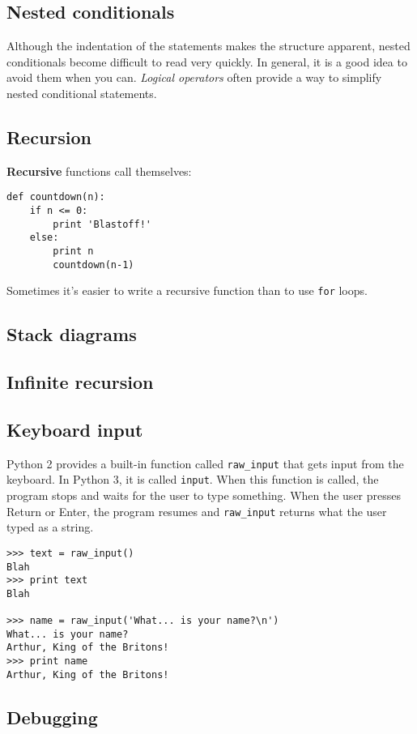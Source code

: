 \documentclass{article}
\begin{document}
\subsection{Nested conditionals}
Although the indentation of the statements makes the structure apparent, nested
conditionals become difficult to read very quickly. In general, it is a good
idea to avoid them when you can. \textit{Logical operators} often provide a way
to simplify nested conditional statements.

\subsection{Recursion}
\textbf{Recursive} functions call themselves:
\begin{lstlisting}
def countdown(n):
    if n <= 0:
        print 'Blastoff!'
    else:
        print n
        countdown(n-1)
\end{lstlisting}
Sometimes it's easier to write a recursive function than to use \verb|for| loops.

\subsection{Stack diagrams}
\subsection{Infinite recursion}
\subsection{Keyboard input}
Python 2 provides a built-in function called \verb|raw_input| that gets input from the
keyboard. In Python 3, it is called \verb|input|. When this function is called, the
program stops and waits for the user to type something. When the user presses
Return or Enter, the program resumes and \verb|raw_input| returns what the user typed
as a string.
\begin{lstlisting}
>>> text = raw_input()
Blah
>>> print text
Blah

>>> name = raw_input('What... is your name?\n')
What... is your name?
Arthur, King of the Britons!
>>> print name
Arthur, King of the Britons!
\end{lstlisting}
\subsection{Debugging}

\newpage  %
\end{document}
